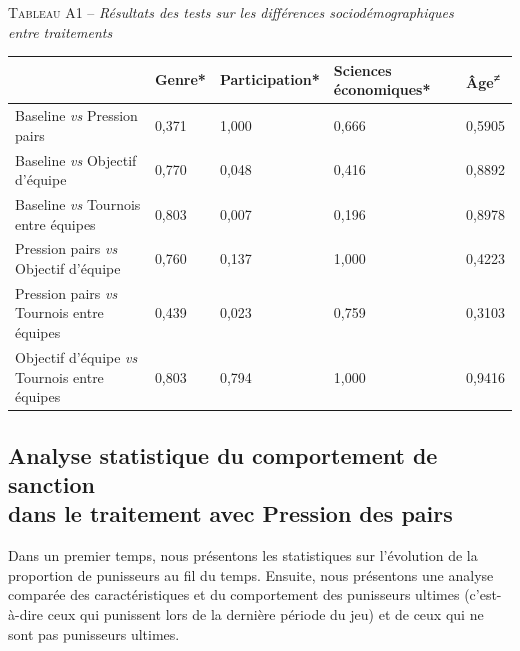 \begin{Article}
\begin{refsection}[Lebourges]
\begin{appendices}

{\centering \textsc{Tableau A1} -- \emph{Résultats des tests sur les différences sociodémographiques\\ entre traitements}\par}

\begin{table}[h!]
\label{tab_A1}
\centering
\begin{tabular}{p{4.2cm}D{1cm}D{1.2cm}D{1.670cm}D{1cm}}
\toprule
    & Genre* & Participation* & Sciences économiques* & Âge\textsuperscript{≠} \tabularnewline
\midrule
Baseline \emph{vs} Pression pairs & 0,371 & 1,000 & 0,666 & 0,5905 \tabularnewline
Baseline \emph{vs} Objectif d'équipe & 0,770 & 0,048 & 0,416 & 0,8892 \tabularnewline
Baseline \emph{vs} Tournois entre équipes & 0,803 & 0,007 & 0,196 & 0,8978 \tabularnewline
Pression pairs \emph{vs} Objectif d'équipe & 0,760 & 0,137 & 1,000 & 0,4223 \tabularnewline
Pression pairs \emph{vs} Tournois entre équipes & 0,439 & 0,023 & 0,759 & 0,3103 \tabularnewline
Objectif d'équipe \emph{vs} Tournois entre équipes & 0,803 & 0,794 & 1,000 & 0,9416 \tabularnewline
\bottomrule
\end{tabular}
\end{table}


\subsection{Analyse statistique du comportement de sanction\\ dans le
traitement avec Pression des pairs}
\label{Annexe:Analyse statist comport}

\vspace{.2cm}
Dans un premier temps, nous présentons les statistiques sur l'évolution
de la proportion de punisseurs au fil du temps. Ensuite, nous présentons
une analyse comparée des caractéristiques et du comportement des
punisseurs ultimes (c'est-à-dire ceux qui punissent lors de la dernière
période du jeu) et de ceux qui ne sont pas punisseurs ultimes.


\end{appendices}
\end{refsection}
\end{Article}
